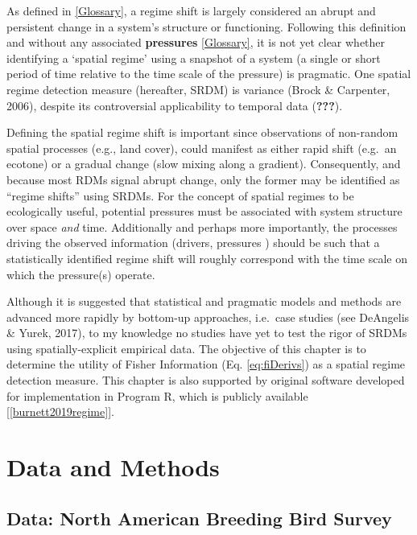 \documentclass[12pt,twoside,openany]{reedthesis}
\begin{document}
As defined in \ref{Glossary}, a regime shift is largely considered an abrupt and persistent change in a system's structure or functioning. Following this definition and without any associated \textbf{pressures} \ref{Glossary}, it is not yet clear whether identifying a `spatial regime' using a snapshot of a system (a single or short period of time relative to the time scale of the pressure) is pragmatic. One spatial regime detection measure (hereafter, SRDM) is variance (Brock \& Carpenter, 2006), despite its controversial applicability to temporal data ({\textbf{???}}).

Defining the spatial regime shift is important since observations of non-random spatial processes (e.g., land cover), could manifest as either rapid shift (e.g.~an ecotone) or a gradual change (slow mixing along a gradient). Consequently, and because most RDMs signal abrupt change, only the former may be identified as ``regime shifts'' using SRDMs. For the concept of spatial regimes to be ecologically useful, potential pressures must be associated with system structure over space \emph{and} time. Additionally and perhaps more importantly, the processes driving the observed information (drivers, pressures ) should be such that a statistically identified regime shift will roughly correspond with the time scale on which the pressure(s) operate.

Although it is suggested that statistical and pragmatic models and methods are advanced more rapidly by bottom-up approaches, i.e.~case studies (see DeAngelis \& Yurek, 2017), to my knowledge no studies have yet to test the rigor of SRDMs using spatially-explicit empirical data. The objective of this chapter is to determine the utility of Fisher Information (Eq. \eqref{eq:fiDerivs}) as a spatial regime detection measure. This chapter is also supported by original software developed for implementation in Program R, which is publicly available {[}\ref{burnett2019regime}{]}.

\hypertarget{data-and-methods}{%
\section{Data and Methods}\label{data-and-methods}}

\hypertarget{data-north-american-breeding-bird-survey}{%
\subsection{Data: North American Breeding Bird Survey}\label{data-north-american-breeding-bird-survey}}
\end{document}
